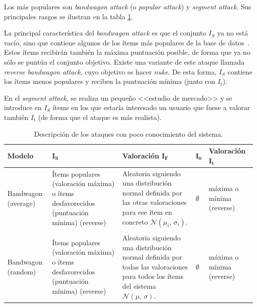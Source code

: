 Los más populares son \textit{bandwagon attack} (o \textit{popular attack}) y \textit{segment attack}. Sus principales rasgos se ilustran en la tabla \ref{tabla_descripcion_ataques_poco_con}.

La principal característica del \textit{bandwagon attack} es que el conjunto $I_S$ ya no está vacío, sino que contiene algunos de los ítems más populares de la base de datos~\cite{zhou2021SemisupervisedRecommendationAttack}. Estos ítems recibirán también la máxima puntuación posible, de forma que ya no sólo se puntúa el conjunto objetivo. Existe una variante de este ataque llamada \textit{reverse bandwagon attack}, cuyo objetivo es hacer \textit{nuke}. De esta forma, $I_S$ contiene los ítems menos populares y reciben la puntuación mínima (junto con $I_t$).

En el \textit{segment attack}, se realiza un pequeño <<estudio de mercado>> y se introduce en $I_S$ ítems en los que estaría interesado un usuario que fuese a valorar también $I_t$ (de forma que el ataque es más realista).

\begin{table}
\small
\begin{centering}
	
		\begin{tabular}{@{}p{5em} p{9em} p{9em} p{2em} p{5em}@{}}
			\toprule
			\textbf{Modelo} & $\mathbf{I_S}$ & \textbf{Valoración} $\mathbf{I_F}$ & $\mathbf{I_0}$ & \textbf{Valoración} $\mathbf{I_t}$\\ 
			\midrule
			
			Bandwagon (average) & Ítems populares (valoración máxima) o ítems desfavorecidos (puntuación mínima) (reverse) & Aleatoria siguiendo una distribución normal definida por las otras valoraciones para ese ítem en concreto $\mathcal{N}(\mu_i,\,\sigma_i)$. & $\emptyset$ & máxima o mínima (reverse) \\\\
			
			Bandwagon (random) & Ítems populares (valoración máxima) o ítems desfavorecidos (puntuación mínima) (reverse) & Aleatoria siguiendo una distribución normal definida por todas las valoraciones para todos los ítems del sistema $\mathcal{N}(\mu,\,\sigma)$. & $\emptyset$ & máxima o mínima (reverse) \\
			\bottomrule
		\end{tabular}

\end{centering}
\caption{Descripción de los ataques con poco conocimiento del sistema.}
\label{tabla_descripcion_ataques_poco_con}
\end{table}



